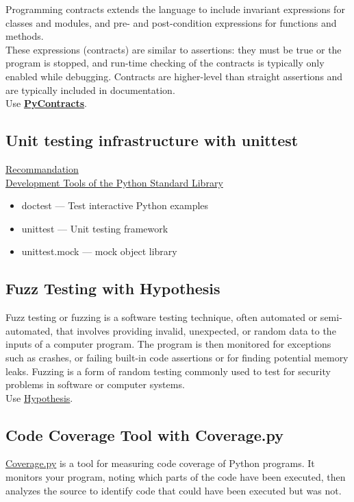 \documentclass[a4paper]{report}
\begin{document}
Programming contracts extends the language to include invariant expressions for classes and modules, and pre- and post-condition expressions for functions and methods.\\
These expressions (contracts) are similar to assertions: they must be true or the program is stopped, and run-time checking of the contracts is typically only enabled while debugging. Contracts are higher-level than straight assertions and are typically included in documentation.\\

Use \href{https://andreacensi.github.io/contracts/}{\textbf{PyContracts}}.


\subsection{Unit testing infrastructure with unittest}
\href{https://wiki.python.org/moin/PythonTestingToolsTaxonomy}{Recommandation}\\
\href{https://docs.python.org/3/library/development.html}{Development Tools of the Python Standard Library}
\begin{itemize}
\item doctest — Test interactive Python examples
\item  unittest — Unit testing framework
\item unittest.mock — mock object library
\end{itemize}

\subsection{Fuzz Testing with Hypothesis}
Fuzz testing or fuzzing is a software testing technique, often automated or semi-automated, that involves providing invalid, unexpected, or random data to the inputs of a computer program. The program is then monitored for exceptions such as crashes, or failing built-in code assertions or for finding potential memory leaks. Fuzzing is a form of random testing commonly used to test for security problems in software or computer systems.\\
Use \href{https://hypothesis.readthedocs.io/en/latest/}{Hypothesis}.

\subsection{Code Coverage Tool with Coverage.py}
\href{http://coverage.readthedocs.io/en/latest/}{Coverage.py} is a tool for measuring code coverage of Python programs. It monitors your program, noting which parts of the code have been executed, then analyzes the source to identify code that could have been executed but was not.
\end{document}
